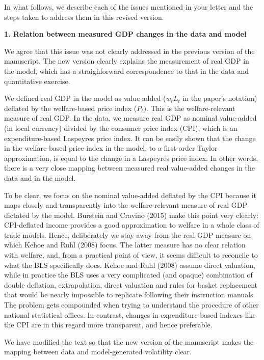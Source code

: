 \documentclass[12pt]{article}
\begin{document}
In what follows, we describe each of the issues mentioned in your letter and
the steps taken to address them in this revised version.\bigskip

\textbf{1. Relation between measured GDP changes in the data and model}

We agree that this issue was not clearly addressed in the previous version
of the manuscript. The new version clearly explains the measurement of real
GDP in the model, which has a straighforward correspondence to that in the
data and quantitative exercise.

We defined real GDP in the model as value-added ($w_{t}L_{t}$ in the paper's
notation) deflated by the welfare-based price index ($P_{t})$. This is the
welfare-relevant measure of real GDP. In the data, we measure real GDP as
nominal value-added (in local currency) divided by the consumer price index
(CPI), which is an expenditure-based Laspeyres price index. It can be easily
shown that the change in the welfare-based price index in the model, to a
first-order Taylor approximation, is equal to the change in a Laspeyres
price index. In other words, there is a very close mapping between measured
real value-added changes in the data and in the model.

To be clear, we focus on the nominal value-added deflated by the CPI because
it maps closely and transparently into the welfare-relevant measure of real
GDP dictated by the model. Burstein and Cravino (2015) make this point very
clearly: CPI-deflated income provides a good approximation to welfare in a
whole class of trade models. Hence, deliberately we stay away from the real
GDP measure on which Kehoe and Ruhl (2008) focus. The latter measure has no
clear relation with welfare, and, from a practical point of view, it seems
difficult to reconcile to what the BLS specifically does. Kehoe and Ruhl
(2008) assume direct valuation, while in practice the BLS uses a very
complicated (and opaque) combination of double deflation, extrapolation,
direct valuation and rules for basket replacement that would be nearly
impossible to replicate following their instruction manuals. The problem
gets compounded when trying to understand the procedure of other national
statistical offices. In contrast, changes in expenditure-based indexes like
the CPI are in this regard more transparent, and hence preferable.

We have modified the text so that the new version of the manuscript makes
the mapping between data and model-generated volatility clear.
\end{document}
